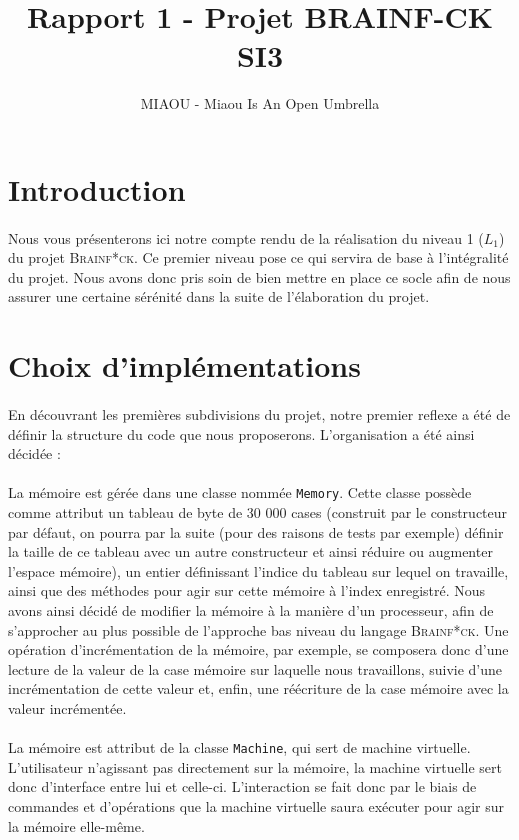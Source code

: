 \documentclass[a4paper]{article}
\title{Rapport 1 - Projet BRAINF-CK SI3}
\author{MIAOU - Miaou Is An Open Umbrella}
\begin{document}
\maketitle{}

\section{Introduction}
\paragraph{}Nous vous présenterons ici notre compte rendu de la réalisation du niveau 1 ($L_1$) du projet \textsc{Brainf*ck}. Ce premier niveau pose ce qui servira de base à l'intégralité du projet. Nous avons donc pris soin de bien mettre en place ce socle afin de nous assurer une certaine sérénité dans la suite de l'élaboration du projet.

\section{Choix d'implémentations}
\paragraph{}En découvrant les premières subdivisions du projet, notre premier reflexe a été de définir la structure du code que nous proposerons. L'organisation a été ainsi décidée :
\paragraph{}La mémoire est gérée dans une classe nommée \texttt{Memory}.
Cette classe possède comme attribut un tableau de byte de 30 000 cases (construit par le constructeur par défaut, on pourra par la suite (pour des raisons de tests par exemple) définir la taille de ce tableau avec un autre constructeur et ainsi réduire ou augmenter l'espace mémoire), un entier définissant l'indice du tableau sur lequel on travaille, ainsi que des méthodes pour agir sur cette mémoire à l'index enregistré. Nous avons ainsi décidé de modifier la mémoire à la manière d'un processeur, afin de s'approcher au plus possible de l'approche bas niveau du langage \textsc{Brainf*ck}. Une opération d'incrémentation de la mémoire, par exemple, se composera donc d'une lecture de la valeur de la case mémoire sur laquelle nous travaillons, suivie d'une incrémentation de cette valeur et, enfin, une réécriture de la case mémoire avec la valeur incrémentée.
\paragraph{}La mémoire est attribut de la classe \texttt{Machine}, qui sert de machine virtuelle.
L'utilisateur n'agissant pas directement sur la mémoire, la machine virtuelle sert donc d'interface entre lui et celle-ci. L'interaction se fait donc par le biais de commandes et d'opérations que la machine virtuelle saura exécuter pour agir sur la mémoire elle-même.
\end{document}

